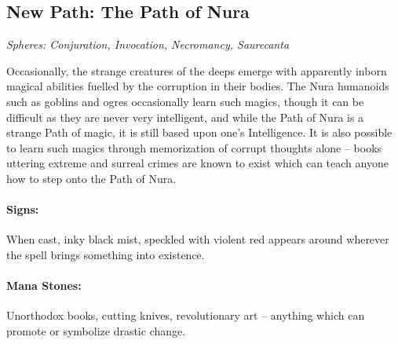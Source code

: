 \label{saurecanta}

\begin{multicols}{2}

\subsection{New Path: The Path of Nura}

\textit{Spheres: Conjuration, Invocation, Necromancy, Saurecanta}

\noindent Occasionally, the strange creatures of the deeps emerge with apparently inborn magical abilities fuelled by the corruption in their bodies.
The Nura humanoids such as goblins and ogres occasionally learn such magics, though it can be difficult as they are never very intelligent, and while the Path of Nura is a strange Path of magic, it is still based upon one's Intelligence.
It is also possible to learn such magics through memorization of corrupt thoughts alone -- books uttering extreme and surreal crimes are known to exist which can teach anyone how to step onto the Path of Nura.

\paragraph{Signs:} When cast, inky black mist, speckled with violent red appears around wherever the spell brings something into existence.

\paragraph{Mana Stones:} Unorthodox books, cutting knives, revolutionary art -- anything which can promote or symbolize drastic change.

\end{multicols}



